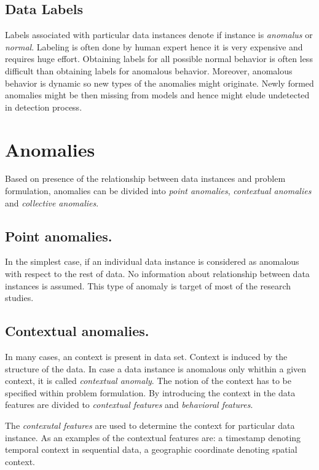 \subsection{Data Labels}

Labels associated with particular data instances denote if instance is \emph{anomalus}
or \emph{normal}. Labeling is often done by human expert hence it is very expensive and requires
huge effort. Obtaining labels for all possible normal behavior is often less difficult
than obtaining labels for anomalous behavior. Moreover, anomalous behavior is dynamic so
new types of the anomalies might originate. Newly formed anomalies might be then missing 
from models and hence might elude undetected in detection process. 

\section{Anomalies}

Based on presence of the relationship between data instances and problem formulation, anomalies
can be divided into \emph{point anomalies}, \emph{contextual anomalies} and \emph{collective anomalies}.

\subsection{Point anomalies.} In the simplest case, if an individual data instance is considered as
anomalous with respect to the rest of data. No information about relationship between data instances
is assumed. This type of anomaly is target of most of the research studies.

\subsection{Contextual anomalies.} In many cases, an context is present in data set. 
Context is induced by the structure of the data. In case a data instance is anomalous only whithin
a given context, it is called \emph{contextual anomaly}. 
The notion of the context has to be specified within problem formulation. 
By introducing the context in the data features are divided to \emph{contextual features}
and \emph{behavioral features}.

The \emph{contexutal features} are used to determine the context for 
particular data instance. As an examples of the contextual features are: a timestamp denoting 
temporal context in sequential data, a geographic coordinate denoting spatial context.

